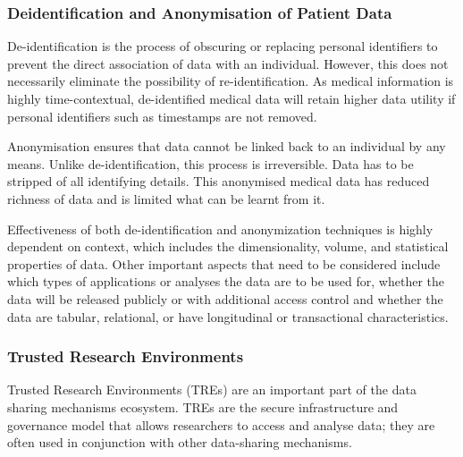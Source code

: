 \documentclass[11pt]{article}
\begin{document}
\subsubsection{Deidentification and Anonymisation of Patient Data}
De-identification is the process of obscuring or replacing personal identifiers to prevent the direct association of data with an individual. However, this does not necessarily eliminate the possibility of re-identification. As medical information is highly time-contextual, de-identified medical data will retain higher data utility if personal identifiers such as timestamps are not removed. 

Anonymisation ensures that data cannot be linked back to an individual by any means. Unlike de-identification, this process is irreversible. Data has to be stripped of all identifying details. This anonymised medical data has reduced richness of data and is limited what can be learnt from it. 

Effectiveness of both de-identification and anonymization techniques is highly dependent on context, which includes the dimensionality, volume, and statistical properties of data. Other important aspects that need to be considered include which types of applications or analyses the data are to be used for, whether the data will be released publicly or with additional access control and whether the data are tabular, relational, or have longitudinal or transactional characteristics.


\subsubsection{Trusted Research Environments}

Trusted Research Environments (TREs) are an important part of the data sharing mechanisms ecosystem. TREs are the secure infrastructure and governance model that allows researchers to access and analyse data; they are often used in conjunction with other data-sharing mechanisms.
\end{document}
